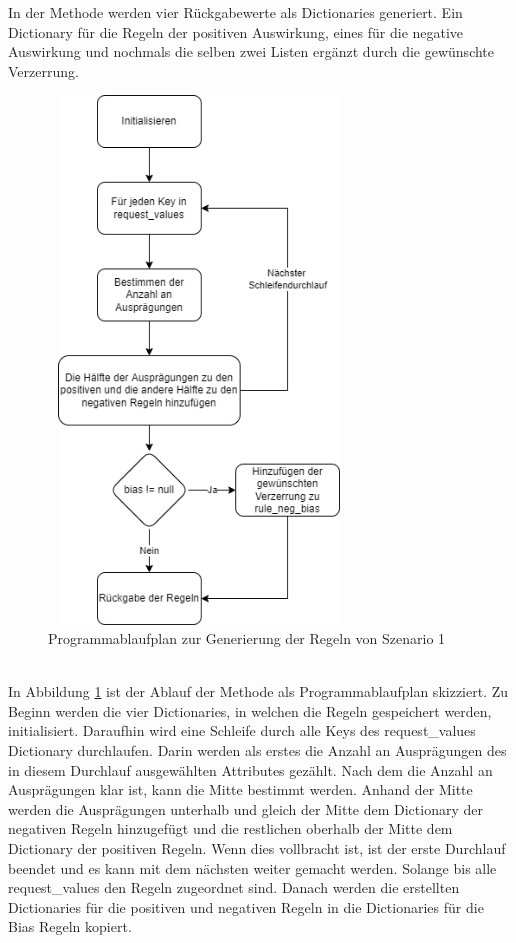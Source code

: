 \begin{onehalfspace}
In der Methode werden vier Rückgabewerte als Dictionaries generiert. Ein Dictionary für die Regeln der positiven Auswirkung, eines für die negative Auswirkung und nochmals die selben zwei Listen ergänzt durch die gewünschte Verzerrung. 
\begin{figure}[h]
    \centering
    \includegraphics[width=8cm,height=14cm]{Diagramme/Sz1_Regeln.drawio.png}
    \caption{Programmablaufplan zur Generierung der Regeln von Szenario 1}
    \label{fig:Sz1Regeln}
\end{figure}\\
In Abbildung \ref{fig:Sz1Regeln} ist der Ablauf der Methode als Programmablaufplan skizziert. Zu Beginn werden die vier Dictionaries, in welchen die Regeln gespeichert werden, initialisiert. Daraufhin wird eine Schleife durch alle Keys des \glqq{}request\_values\grqq{} Dictionary durchlaufen. Darin werden als erstes die Anzahl an Ausprägungen des in diesem Durchlauf ausgewählten Attributes gezählt. Nach dem die Anzahl an Ausprägungen klar ist, kann die Mitte bestimmt werden. Anhand der Mitte werden die Ausprägungen unterhalb und gleich der Mitte dem Dictionary der negativen Regeln hinzugefügt und die restlichen oberhalb der Mitte dem Dictionary der positiven Regeln. Wenn dies vollbracht ist, ist der erste Durchlauf beendet und es kann mit dem nächsten weiter gemacht werden. Solange bis alle \glqq{}request\_values\grqq{} den Regeln zugeordnet sind. Danach werden die erstellten Dictionaries für die positiven und negativen Regeln in die Dictionaries für die Bias Regeln kopiert.

\end{onehalfspace}
